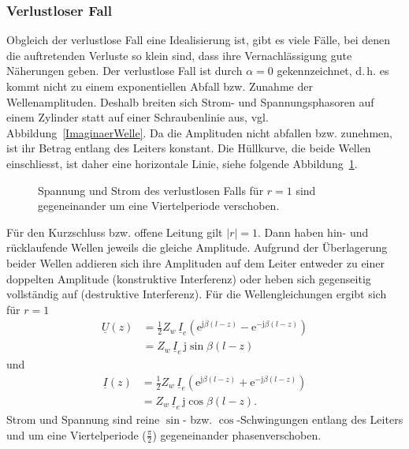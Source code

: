 \documentclass[paper=a4, parskip=half-, ngerman, fontsize=11pt]{scrreprt}
\begin{document}
\subsubsection{Verlustloser Fall}
Obgleich der verlustlose Fall eine Idealisierung ist, gibt es viele Fälle, bei denen die auftretenden Verluste so klein
sind, dass ihre Vernachlässigung gute Näherungen geben. Der verlustlose Fall ist durch $\alpha = 0$ gekennzeichnet,
d.\,h. es kommt nicht zu einem exponentiellen Abfall bzw. Zunahme der Wellenamplituden. Deshalb breiten sich Strom- und
Spannungsphasoren auf einem Zylinder statt auf einer Schraubenlinie aus, vgl.\,Abbildung~\ref{ImaginaerWelle}. Da die
Amplituden nicht abfallen bzw. zunehmen, ist ihr Betrag entlang des Leiters konstant. Die Hüllkurve, die beide Wellen
einschliesst, ist daher eine horizontale Linie, siehe folgende Abbildung~\ref{VerlustlosBetrag}.
\begin{figure}[!htb]
    \begin{center}
        
        \caption{Spannung und Strom des verlustlosen Falls für $r = 1$ sind gegeneinander um eine Viertelperiode
        verschoben.}
        \label{VerlustlosBetrag}
    \end{center}
\end{figure}
Für den Kurzschluss bzw. offene Leitung gilt $|r|=1$. Dann haben hin- und rücklaufende Wellen jeweils die gleiche
Amplitude. Aufgrund der Überlagerung beider Wellen addieren sich ihre Amplituden auf dem Leiter entweder zu einer
doppelten Amplitude (konstruktive Interferenz) oder heben sich gegenseitig vollständig auf (destruktive Interferenz).
Für die Wellengleichungen ergibt sich für $r = 1$
\begin{align*}
\underline{U}(z) &= \frac{1}{2} Z_{w} \, \underline{I}_{e}
\left( \mathrm{e}^{\mathrm{j} \beta (l - z)} - \mathrm{e}^{- \mathrm{j} \beta (l - z)} \right) \\[1ex]
&= Z_{w} \, \underline{I}_{e} \, \mathrm{j} \sin \beta (l - z)
\end{align*}
und
\begin{align*}
    \underline{I}(z) &= \frac{1}{2} Z_{w} \, \underline{I}_{e}
    \left( \mathrm{e}^{\mathrm{j} \beta (l - z)} + \mathrm{e}^{- \mathrm{j} \beta (l - z)} \right) \\[1ex]
    &= Z_{w} \, \underline{I}_{e} \, \mathrm{j} \cos \beta (l - z).
\end{align*}
Strom und Spannung sind reine $\sin$- bzw. $\cos$-Schwingungen entlang des Leiters und um eine Viertelperiode
($\frac{\pi}{2}$) gegeneinander phasenverschoben.
\end{document}

